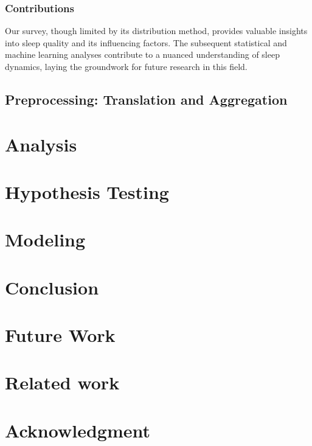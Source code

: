 \documentclass[conference]{IEEEtran}
\begin{document}
\subsubsection*{Contributions}
Our survey, though limited by its distribution method, provides valuable insights into sleep quality and its influencing factors. The subsequent statistical and machine learning analyses contribute to a nuanced understanding of sleep dynamics, laying the groundwork for future research in this field.
\subsection{Preprocessing: Translation and Aggregation}
\section{Analysis}
\section{Hypothesis Testing}
\section{Modeling}
\section{Conclusion}
\section{Future Work}


\section{Related work}
\section*{Acknowledgment}


\end{document}
